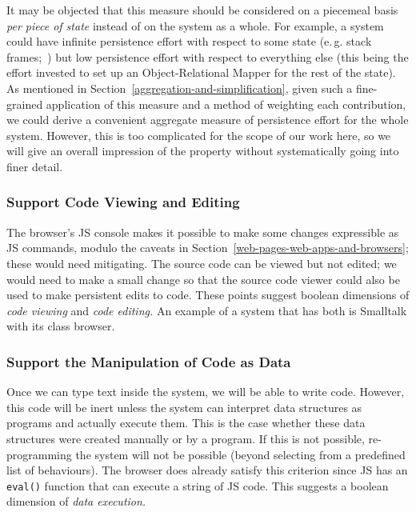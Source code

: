 \documentclass[ twoside,openright,titlepage,numbers=noenddot,headinclude,footinclude,cleardoublepage=empty,abstract=on,
                BCOR=5mm,paper=a4,fontsize=11pt
                ]{scrreprt}
\newcommand{\eg}{e.\,g.}
\theoremstyle{definition}
\begin{document}
It may be objected that this measure should be considered on a piecemeal
basis \emph{per piece of state} instead of on the system as a whole. For
example, a system could have infinite persistence effort with respect to
some state (\eg{} stack frames;~\cite{Externalize}) but low persistence
effort with respect to everything else (this being the effort invested
to set up an Object-Relational Mapper for the rest of the state). As
mentioned in Section~\ref{aggregation-and-simplification}, given such a
fine-grained application of this measure and a method of weighting each
contribution, we could derive a convenient aggregate measure of
persistence effort for the whole system. However, this is too
complicated for the scope of our work here, so we will give an overall
impression of the property without systematically going into finer
detail.

\hypertarget{support-code-viewing-and-editing}{\subsubsection{Support Code Viewing and
Editing}\label{support-code-viewing-and-editing}}

The browser's \ac{JS} console makes it possible to make some changes
expressible as \ac{JS} commands, modulo the caveats in
Section~\ref{web-pages-web-apps-and-browsers}; these would need
mitigating. The source code can be viewed but not edited; we would need
to make a small change so that the source code viewer could also be used
to make persistent edits to code. These points suggest boolean
dimensions of \emph{code viewing} and \emph{code editing.} An example of
a system that has both is Smalltalk with its class browser.

\hypertarget{support-the-manipulation-of-code-as-data}{\subsubsection{Support the Manipulation of Code as
Data}\label{support-the-manipulation-of-code-as-data}}

Once we can type text inside the system, we will be able to write code.
However, this code will be inert unless the system can interpret data
structures as programs and actually execute them. This is the case
whether these data structures were created manually or by a program. If
this is not possible, re-programming the system will not be possible
(beyond selecting from a predefined list of behaviours). The browser
does already satisfy this criterion since \ac{JS} has an \texttt{eval()}
function that can execute a string of \ac{JS} code. This suggests a
boolean dimension of \emph{data execution.}
\end{document}
